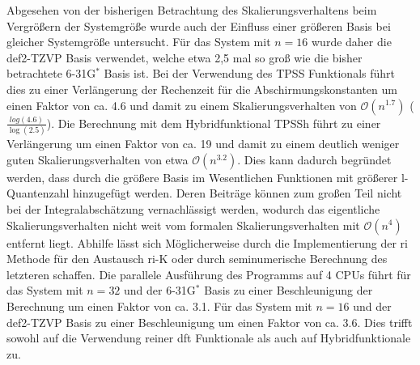 \bigskip
Abgesehen von der bisherigen Betrachtung des Skalierungsverhaltens beim Vergrößern der Systemgröße wurde auch der Einfluss einer größeren Basis bei gleicher Systemgröße untersucht. Für das  System mit $n=16$ wurde daher die def2-TZVP Basis verwendet, welche etwa 2,5 mal so groß wie die bisher betrachtete 6-31G$^*$ Basis ist. Bei der Verwendung des TPSS Funktionals führt dies zu einer Verlängerung der Rechenzeit für die Abschirmungskonstanten um einen Faktor von ca. 4.6 und damit zu einem Skalierungsverhalten von $\mathcal{O}(n^{1.7})$ ($\frac{log(4.6)}{\log(2.5)}$). Die Berechnung mit dem Hybridfunktional TPSSh führt zu einer Verlängerung um einen Faktor von ca. 19 und damit zu einem deutlich weniger guten Skalierungsverhalten von etwa $\mathcal{O}(n^{3.2})$. Dies kann dadurch begründet werden, dass durch die größere Basis im Wesentlichen Funktionen mit größerer l-Quantenzahl hinzugefügt werden. Deren Beiträge können zum großen Teil nicht bei der Integralabschätzung vernachlässigt werden, wodurch das eigentliche Skalierungsverhalten nicht weit vom formalen Skalierungsverhalten mit $\mathcal{O}(n^{4})$ entfernt liegt. Abhilfe lässt sich Möglicherweise durch die Implementierung der \ac{ri} Methode für den Austausch {\ac{ri}-K}\supercite{weigend2002fully} oder durch seminumerische Berechnung\supercite{neese2009efficient,plessow2012seminumerical} des letzteren schaffen. Die parallele Ausführung des Programms auf 4 CPUs führt für das System mit $n=32$ und der 6-31G$^*$ Basis zu einer Beschleunigung der Berechnung um einen Faktor von ca. 3.1. Für das System mit $n=16$ und der def2-TZVP Basis zu einer Beschleunigung um einen Faktor von ca. 3.6. Dies trifft sowohl auf die Verwendung reiner \ac{dft} Funktionale als auch auf Hybridfunktionale zu.

